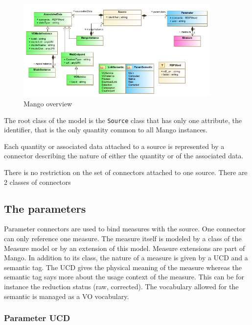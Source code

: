 \documentclass[11pt,a4paper]{ivoa}
\begin{document}
\begin{figure}
\includegraphics[width=0.9\textwidth]{../model/overview_diagram.png}
\caption{Mango overview}
\label{fig:overview}
\end{figure}

The root class of the model is the \texttt{Source} class that has only one attribute, the identifier, that is the only quantity common to  all  Mango instances.

Each quantity or associated data attached to a source is represented by a connector describing the nature of either the quantity or of the associated data.

There is no restriction on the set of connectors attached to one source.
There are 2 classes of connectors

\subsection{The parameters} 
Parameter connectors are used to bind measures with the source. One connector can only reference one measure. The measure itself is modeled by a class of the Measure model or by an extension of this model. Measure extensions are part of Mango. 
In addition to its class, the nature of a measure is given by a UCD and a semantic tag. The UCD gives the physical meaning of the measure whereas the semantic tag says more about the usage context of the measure. This can be for instance the reduction status (raw, corrected). The vocabulary allowed for the semantic is managed as a VO vocabulary. 

\subsubsection{Parameter UCD}
\end{document}
